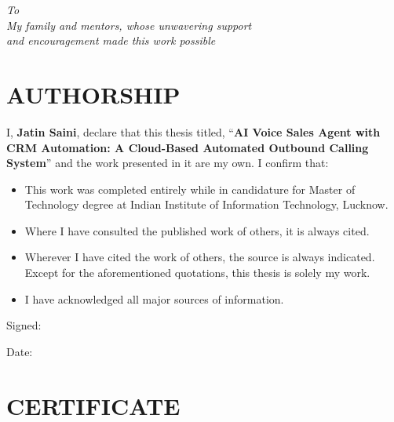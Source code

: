\documentclass[12pt,a4paper,oneside]{book}
\begin{document}
\newpage\thispagestyle{empty}\mbox{}\newpage

\thispagestyle{empty}
\vspace*{5cm}
\begin{center}
\textit{To}\\
\textit{My family and mentors, whose unwavering support\\
and encouragement made this work possible}
\end{center}
\newpage\thispagestyle{empty}\mbox{}\newpage

\chapter*{AUTHORSHIP}

I, \textbf{Jatin Saini}, declare that this thesis titled, ``\textbf{AI Voice Sales Agent with CRM Automation: A Cloud-Based Automated Outbound Calling System}'' and the work presented in it are my own. I confirm that:

\begin{itemize}
    \item This work was completed entirely while in candidature for Master of Technology degree at Indian Institute of Information Technology, Lucknow.
    \item Where I have consulted the published work of others, it is always cited.
    \item Wherever I have cited the work of others, the source is always indicated. Except for the aforementioned quotations, this thesis is solely my work.
    \item I have acknowledged all major sources of information.
\end{itemize}

\vspace{2cm}

\noindent Signed: \hrulefill

\vspace{0.5cm}

\noindent Date: \hrulefill

\newpage\thispagestyle{empty}\mbox{}\newpage

\chapter*{CERTIFICATE}
\end{document}
